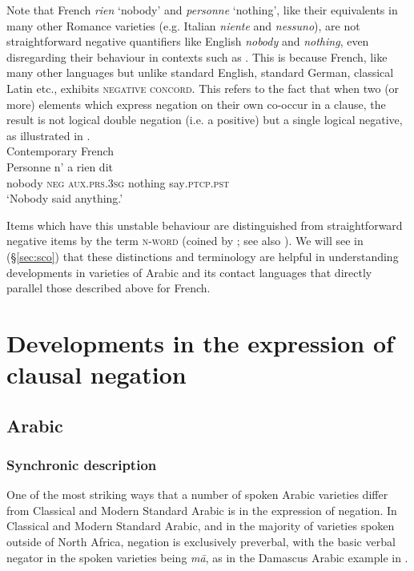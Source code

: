 \documentclass[output=paper]{langsci/langscibook}
\begin{document}
Note that French \textit{rien} ‘nobody’ and \textit{personne} ‘nothing’, like their equivalents in many other Romance varieties (e.g. Italian \textit{niente} and \textit{nessuno}), are not straightforward negative quantifiers like English \textit{nobody} and \textit{nothing}, even disregarding their behaviour in contexts such as . This is because French, like many other languages but unlike standard English, standard German, classical Latin etc., exhibits \textsc{negative} \textsc{concord}. This refers to the fact that when two (or more) elements which express negation on their own co-occur in a clause, the result is not logical double negation (i.e. a positive) but a single logical negative, as illustrated in .\\

\ea\label{ex:key:cont2}
{       Contemporary French \citep[69]{Hansen2013}} \\
\gll Personne n’ a rien dit\\
     nobody \textsc{neg} \textsc{aux}.\textsc{prs.3sg} nothing say\textsc{.ptcp.pst}\\
\glt ‘Nobody said anything.’
\z

Items which have this unstable behaviour are distinguished from straightforward negative items by the term \textsc{n-word} (coined by \citealt{Laka1990}; see also \citealt{Giannakidou2006}). We will see in (§\ref{sec:sco}) that these distinctions and terminology are helpful in understanding developments in varieties of Arabic and its contact languages that directly parallel those described above for French.


\section{Developments in the expression of clausal negation}\label{sec:dev}


\subsection{Arabic}





\subsubsection{Synchronic description}



One of the most striking ways that a number of spoken Arabic varieties differ from Classical and Modern Standard Arabic is in the expression of negation. In Classical and Modern Standard Arabic, and in the majority of varieties spoken outside of North Africa, negation is exclusively preverbal, with the basic verbal negator in the spoken varieties being \textit{mā}, as in the Damascus Arabic example in .
\end{document}
